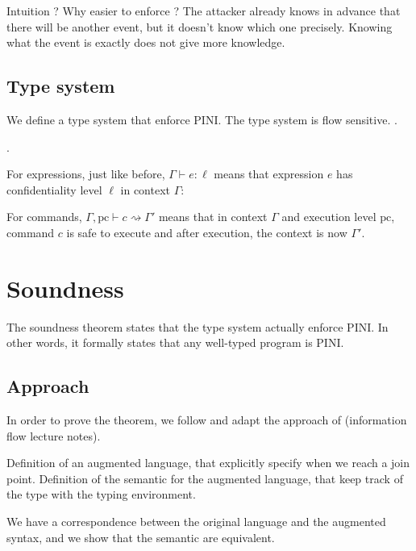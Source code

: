 \documentclass[10pt]{article}
\newcommand{\pc}{\mathrm{pc}}
\newcommand{\ctx}{\Gamma}
\newcommand{\typing}[4]{ #1, #2 \vdash #3 \rightsquigarrow #4}
\newcommand{\etyping}[3]{ #1 \vdash #2 : #3}
\begin{document}
Intuition ? Why easier to enforce ?
The attacker already knows in advance that there will be another event, but it doesn't know which
one precisely. Knowing what the event is exactly does not give more knowledge.

\subsection{Type system}%
\label{subsec:type_system}

We define a type system that enforce PINI.
The type system is flow sensitive.
.

.

For expressions, just like before, \( \etyping{\ctx}{e}{\ell} \) means that expression \( e \) has
confidentiality level \( \ell \) in context \( \ctx \):



For commands, \( \typing{\ctx}{\pc}{c}{\ctx'} \) means that in context \( \ctx \) and execution
level \( \pc \), command \( c \) is safe to execute and after execution, the context is now
\( \ctx' \).



\section{Soundness}%
\label{sec:soundness}

The soundness theorem states that the type system actually enforce PINI. In other words, it formally
states that any well-typed program is PINI.


\subsection{Approach}%
\label{subsec:approach}

In order to prove the theorem, we follow and adapt the approach of (information flow lecture notes).

Definition of an augmented language, that explicitly specify when we reach a join point. Definition
of the semantic for the augmented language, that keep track of the type with the typing environment.

We have a correspondence between the original language and the augmented syntax, and we show that
the semantic are equivalent.
\end{document}
